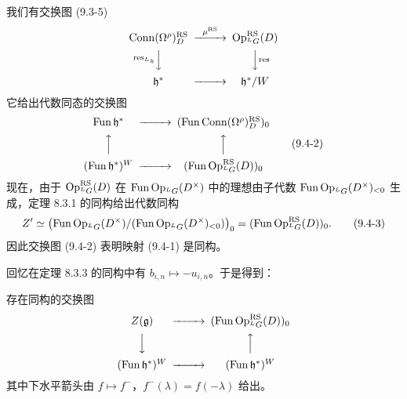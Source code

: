 我们有交换图 (9.3-5)
\begin{equation*}
    \begin{CD}
        \operatorname{Conn}(\Omega^\rho)^{\mathrm{RS}}_D @>\mu^{\mathrm{RS}}>>
            \Op^{\mathrm{RS}}_{{}^LG}(D)\\
        @V{\operatorname{res}_{{}^L\mathfrak{h}}}VV @VV{\operatorname{res}}V\\
        \mathfrak{h}^* @>>> \mathfrak{h}^*/W
    \end{CD}
\end{equation*}
它给出代数同态的交换图
\begin{equation}
    \begin{CD}
        \operatorname{Fun}\mathfrak{h}^* @>>>
            (\operatorname{Fun}\operatorname{Conn}(\Omega^\rho)^{\mathrm{RS}}_D)_0\\
        @AAA @AAA\\
        (\operatorname{Fun}\mathfrak{h}^*)^W @>>>
            (\operatorname{Fun}\Op^{\mathrm{RS}}_{{}^LG}(D))_0
    \end{CD}
    \tag{9.4-2}
\end{equation}
现在，由于 $\operatorname{Op}^{\mathrm{RS}}_{{}^LG}(D)$ 在 $\operatorname{Fun}\operatorname{Op}_{{}^LG}(D^\times)$ 中的理想由子代数 $\operatorname{Fun}\operatorname{Op}_{{}^LG}(D^\times)_{<0}$ 生成，定理 8.3.1 的同构给出代数同构
\begin{equation}
    Z'\simeq\left(\operatorname{Fun}\operatorname{Op}_{{}^LG}(D^\times)/(\operatorname{Fun}\operatorname{Op}_{{}^LG}(D^\times)_{<0})\right)_0
    =(\operatorname{Fun}\operatorname{Op}^{\mathrm{RS}}_{{}^LG}(D))_0 .
    \tag{9.4-3}
\end{equation}
因此交换图 (9.4-2) 表明映射 (9.4-1) 是同构。

回忆在定理 8.3.3 的同构中有 $b_{i,n}\mapsto-u_{i,n}$。于是得到：

\begin{proposition}[{[Frenkel 2005b]}, Prop. 12.8]
    存在同构的交换图
    \[
        \begin{CD}
            Z(\mathfrak{g}) @>>> (\operatorname{Fun}\Op^{\mathrm{RS}}_{{}^LG}(D))_0\\
            @VVV @AAA\\
            (\operatorname{Fun}\mathfrak{h}^*)^W @>>> (\operatorname{Fun}\mathfrak{h}^*)^W
        \end{CD}
    \]
    其中下水平箭头由 $f\mapsto f^-$，$f^-(\lambda)=f(-\lambda)$ 给出。
\end{proposition}

